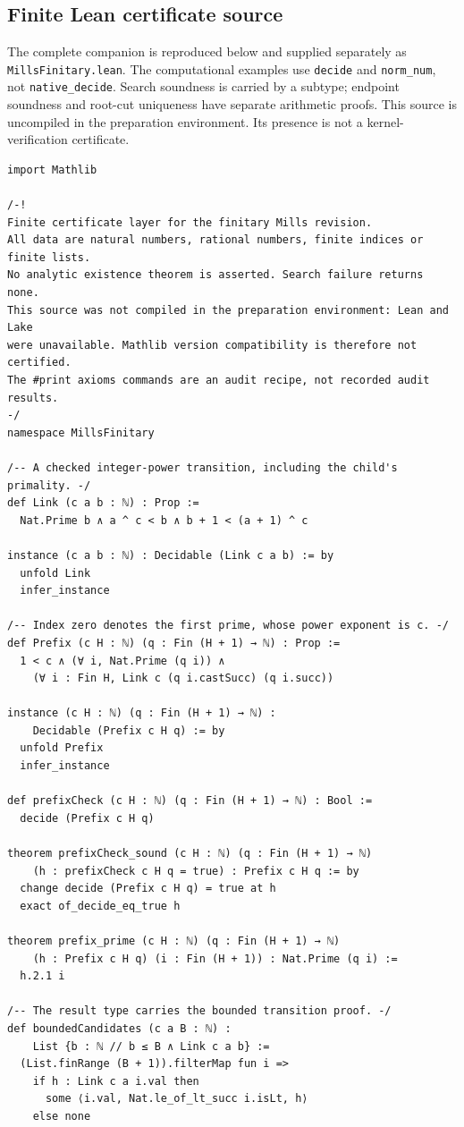 \documentclass[11pt,reqno]{amsart}
\theoremstyle{blueplain}
\newcounter{type}
\newcounter{asser}
\numberwithin{equation}{section}
\begin{document}
\subsection{Finite Lean certificate source}\label{fin:sec:scripts-lean}
The complete companion is reproduced below and supplied separately as
\texttt{MillsFinitary.lean}. The computational examples use \texttt{decide}
and \texttt{norm\_num}, not \texttt{native\_decide}. Search soundness is
carried by a subtype; endpoint soundness and root-cut uniqueness have
separate arithmetic proofs. This source is uncompiled in the preparation
environment. Its presence is not a kernel-verification certificate.
\begin{lstlisting}[style=lean,basicstyle=\ttfamily\scriptsize,numberstyle=\scriptsize]
import Mathlib

/-!
Finite certificate layer for the finitary Mills revision.
All data are natural numbers, rational numbers, finite indices or finite lists.
No analytic existence theorem is asserted. Search failure returns none.
This source was not compiled in the preparation environment: Lean and Lake
were unavailable. Mathlib version compatibility is therefore not certified.
The #print axioms commands are an audit recipe, not recorded audit results.
-/
namespace MillsFinitary

/-- A checked integer-power transition, including the child's primality. -/
def Link (c a b : ℕ) : Prop :=
  Nat.Prime b ∧ a ^ c < b ∧ b + 1 < (a + 1) ^ c

instance (c a b : ℕ) : Decidable (Link c a b) := by
  unfold Link
  infer_instance

/-- Index zero denotes the first prime, whose power exponent is c. -/
def Prefix (c H : ℕ) (q : Fin (H + 1) → ℕ) : Prop :=
  1 < c ∧ (∀ i, Nat.Prime (q i)) ∧
    (∀ i : Fin H, Link c (q i.castSucc) (q i.succ))

instance (c H : ℕ) (q : Fin (H + 1) → ℕ) :
    Decidable (Prefix c H q) := by
  unfold Prefix
  infer_instance

def prefixCheck (c H : ℕ) (q : Fin (H + 1) → ℕ) : Bool :=
  decide (Prefix c H q)

theorem prefixCheck_sound (c H : ℕ) (q : Fin (H + 1) → ℕ)
    (h : prefixCheck c H q = true) : Prefix c H q := by
  change decide (Prefix c H q) = true at h
  exact of_decide_eq_true h

theorem prefix_prime (c H : ℕ) (q : Fin (H + 1) → ℕ)
    (h : Prefix c H q) (i : Fin (H + 1)) : Nat.Prime (q i) :=
  h.2.1 i

/-- The result type carries the bounded transition proof. -/
def boundedCandidates (c a B : ℕ) :
    List {b : ℕ // b ≤ B ∧ Link c a b} :=
  (List.finRange (B + 1)).filterMap fun i =>
    if h : Link c a i.val then
      some ⟨i.val, Nat.le_of_lt_succ i.isLt, h⟩
    else none


\end{lstlisting}
\end{document}

